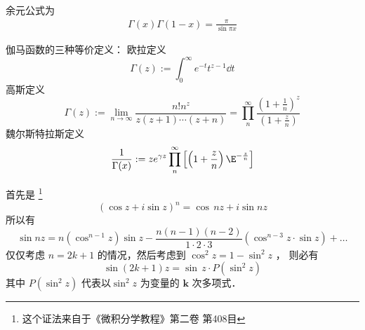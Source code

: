 
余元公式为
\begin{align}
\Gamma(x)\Gamma(1-x)=\frac{\pi}{\sin  \pi x}
\end{align}

\begin{lemma}{伽马函数的三种等价定义：}
欧拉定义
\begin{equation}
\Gamma(z):=\int^{\infty}_{0}e^{-t}t^{z-1} \dd{t}
\end{equation}
高斯定义
\begin{equation}
\Gamma(z):=\lim_{n \rightarrow \infty}{\frac{n!n^z}{z(z+1)⋯ (z+n)}}=\prod_{n}^{\infty}\frac{\left( 1+\frac1n \right)^z}{\left( 1+\frac zn \right)}
\end{equation}
魏尔斯特拉斯定义
\begin{equation}
\frac1{\Gamma(x)}:=ze^{\gamma z}\prod_{n}^{\infty}\left[ \left( 1+\frac{z}{n}\right)\E^{-\frac{z}{n}}  \right]
\end{equation}
\end{lemma}
首先是 \footnote{这个证法来自于《微积分学教程》第二卷 第408目}
\begin{equation}
(\cos z+i\sin z)^n=\cos\,nz+i\sin nz
\end{equation}
所以有
\begin{equation}
\sin nz=n(\cos^{n-1}z)\sin z-\frac{n(n-1)(n-2)}{1\cdot 2\cdot 3}(\cos^{n-3}z \cdot \sin z)+\dots
\end{equation}
仅仅考虑 $n=2k+1$ 的情况，然后考虑到 $\cos^2 z=1-\sin^2z$ ， 则必有
\begin{equation}
\sin(2k+1)z=\sin\,z\cdot P(\sin^2z)
\end{equation}
其中 $P(\sin^2z)$ 代表以$ \sin^2z$ 为变量的 $\mathbf{k}$ 次多项式．

